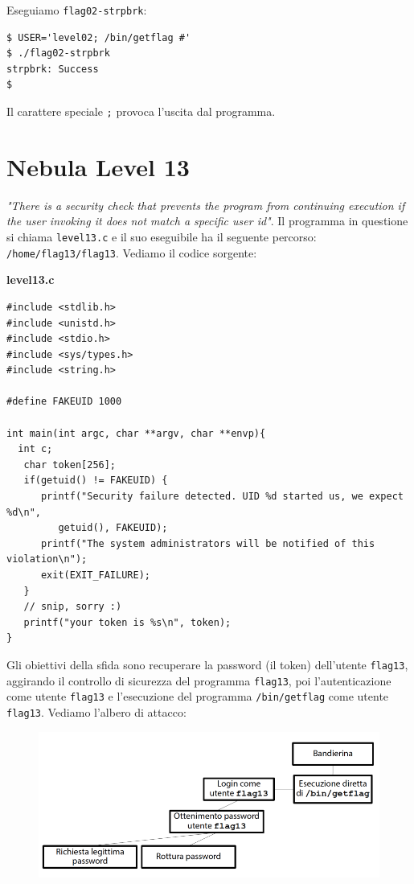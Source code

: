 Eseguiamo \texttt{flag02-strpbrk}:

\begin{mdframed}[backgroundcolor=white!20,shadow=false]
\begin{lstlisting}
$ USER='level02; /bin/getflag #'
$ ./flag02-strpbrk
strpbrk: Success
$
\end{lstlisting}
\end{mdframed}
Il carattere speciale \texttt{;} provoca l'uscita dal programma.

\section{Nebula Level 13}
\textit{"There is a security check that prevents the
program from continuing execution if the user
invoking it does not match a specific user id"}. Il programma in questione si chiama \texttt{level13.c} e il suo eseguibile ha il seguente percorso: \texttt{/home/flag13/flag13}. Vediamo il codice sorgente:

\begin{mdframed}[backgroundcolor=white!20,shadow=false]
\textbf{level13.c}
\begin{verbatim}
#include <stdlib.h>
#include <unistd.h>
#include <stdio.h>
#include <sys/types.h>
#include <string.h>

#define FAKEUID 1000

int main(int argc, char **argv, char **envp){
  int c;
   char token[256];
   if(getuid() != FAKEUID) {
      printf("Security failure detected. UID %d started us, we expect %d\n",
         getuid(), FAKEUID);
      printf("The system administrators will be notified of this violation\n");
      exit(EXIT_FAILURE);
   }
   // snip, sorry :)
   printf("your token is %s\n", token);
}
\end{verbatim}
\end{mdframed}
Gli obiettivi della sfida sono recuperare la password (il token) dell'utente \texttt{flag13}, aggirando il controllo di sicurezza del programma \texttt{flag13}, poi l'autenticazione come utente \texttt{flag13} e l'esecuzione del programma \texttt{/bin/getflag} come utente \texttt{flag13}. Vediamo l'albero di attacco:

\begin{figure}[hbpt!]
    \centering
    \includegraphics[width=0.8 \textwidth]{./Images/cap5/5.10.png}
\end{figure}
\FloatBarrier

